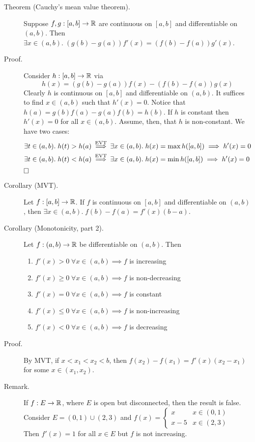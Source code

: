 \documentclass[letterpaper,11pt]{article}
\begin{document}
\begin{description}
\item[Theorem (Cauchy's mean value theorem).] Suppose $f,g:[a,b]\to\mathbb{R}$
    are continuous on $[a,b]$ and differentiable on $(a,b)$.
    Then $\exists x\in(a,b).\;(g(b)-g(a))f'(x)=(f(b)-f(a))g'(x)$.

\item[Proof.] Consider $h:[a,b]\to\mathbb{R}$ via
    \[
    h(x)=(g(b)-g(a))f(x)-(f(b)-f(a))g(x)
    \]
    Clearly $h$ is continuous on $[a,b]$ and differentiable on $(a,b)$.
    It suffices to find $x\in(a,b)$ such that $h'(x)=0$.
    Notice that $h(a)=g(b)f(a)-g(a)f(b)=h(b)$.
    If $h$ is constant then $h'(x)=0$ for all $x\in(a,b)$.
    Assume, then, that $h$ is non-constant. We have two cases:
    \begin{align*}
    \exists t\in(a,b).\;h(t)>h(a) &\stackrel{\text{EVT}}{\implies}
        \exists x\in(a,b).\;h(x)=\max h([a,b])\implies h'(x)=0\\
    \exists t\in(a,b).\;h(t)<h(a) &\stackrel{\text{EVT}}{\implies}
        \exists x\in(a,b).\;h(x)=\min h([a,b])\implies h'(x)=0
    \end{align*}
    $\hfill\square$

\item[Corollary (MVT).] Let $f:[a,b]\to\mathbb{R}$. If $f$ is continuous on $[a,b]$
    and differentiable on $(a,b)$, then
    $\exists x\in(a,b).\;f(b)-f(a)=f'(x)(b-a)$.

\item[Corollary (Monotonicity, part 2).] Let $f:(a,b)\to\mathbb{R}$ be
    differentiable on $(a,b)$. Then
    \begin{enumerate}[1)]
    \item $f'(x)>0\;\forall x\in(a,b)\implies f$ is increasing
    \item $f'(x)\ge 0\;\forall x\in(a,b)\implies f$ is non-decreasing
    \item $f'(x)=0\;\forall x\in(a,b)\implies f$ is constant
    \item $f'(x)\le 0\;\forall x\in(a,b)\implies f$ is non-increasing
    \item $f'(x)<0\;\forall x\in(a,b)\implies f$ is decreasing
    \end{enumerate}

\item[Proof.] By MVT, if $x<x_1<x_2<b$, then
    $f(x_2)-f(x_1)=f'(x)(x_2-x_1)$ for some $x\in(x_1,x_2)$.

\item[Remark.] If $f:E\to\mathbb{R}$, where $E$ is open but disconnected,
    then the result is false.\\
    Consider $E=(0,1)\cup(2,3)$ and $f(x)=\begin{cases}
      x & x\in(0,1)\\
      x-5 & x\in(2,3)
    \end{cases}$\\
    Then $f'(x)=1$ for all $x\in E$ but $f$ is not increasing.
\end{description}
\end{document}
